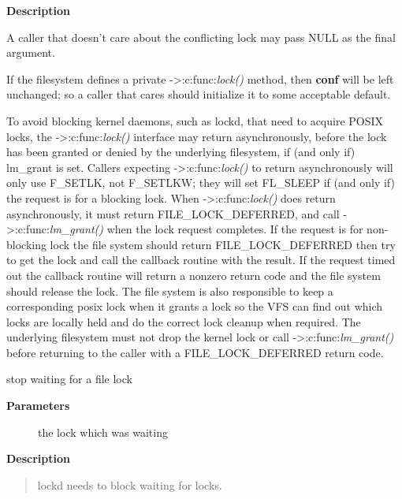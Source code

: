 \documentclass[a4paper,8pt,english]{sphinxmanual}
\begin{document}
\textbf{Description}

A caller that doesn't care about the conflicting lock may pass NULL
as the final argument.

If the filesystem defines a private -\textgreater{}:c:func:\emph{lock()} method, then \textbf{conf} will
be left unchanged; so a caller that cares should initialize it to
some acceptable default.

To avoid blocking kernel daemons, such as lockd, that need to acquire POSIX
locks, the -\textgreater{}:c:func:\emph{lock()} interface may return asynchronously, before the lock has
been granted or denied by the underlying filesystem, if (and only if)
lm\_grant is set. Callers expecting -\textgreater{}:c:func:\emph{lock()} to return asynchronously
will only use F\_SETLK, not F\_SETLKW; they will set FL\_SLEEP if (and only if)
the request is for a blocking lock. When -\textgreater{}:c:func:\emph{lock()} does return asynchronously,
it must return FILE\_LOCK\_DEFERRED, and call -\textgreater{}:c:func:\emph{lm\_grant()} when the lock
request completes.
If the request is for non-blocking lock the file system should return
FILE\_LOCK\_DEFERRED then try to get the lock and call the callback routine
with the result. If the request timed out the callback routine will return a
nonzero return code and the file system should release the lock. The file
system is also responsible to keep a corresponding posix lock when it
grants a lock so the VFS can find out which locks are locally held and do
the correct lock cleanup when required.
The underlying filesystem must not drop the kernel lock or call
-\textgreater{}:c:func:\emph{lm\_grant()} before returning to the caller with a FILE\_LOCK\_DEFERRED
return code.

\begin{fulllineitems}
\label{filesystems/index:c.posix_unblock_lock}
stop waiting for a file lock

\end{fulllineitems}


\textbf{Parameters}
\begin{description}
\item[{}] \leavevmode
the lock which was waiting

\end{description}

\textbf{Description}
\begin{quote}

lockd needs to block waiting for locks.
\end{quote}
\end{document}
